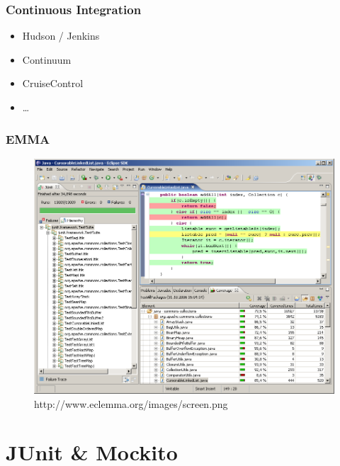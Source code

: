 \documentclass{beamer}
\begin{document}
			\begin{frame}
				\frametitle{Continuous Integration}

				\begin{itemize}
					\item{Hudson / Jenkins}
					\item{Continuum}
					\item{CruiseControl}
					\item{\ldots}
				\end{itemize}
			\end{frame}

			\begin{frame}
				\frametitle{EMMA}

				\begin{figure}[htb]
					\begin{center}
						\includegraphics[scale=0.25]{images/eclemma}
					\end{center}
					\caption{http://www.eclemma.org/images/screen.png}
				\end{figure}
			\end{frame}

	
	\section{JUnit \& Mockito}

\end{document}
